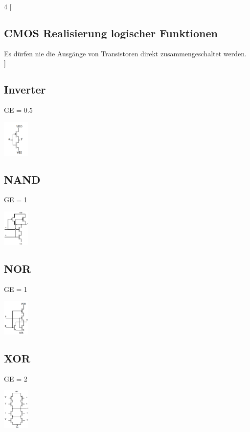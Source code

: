 \documentclass[10pt]{article}
\begin{document}
\begin{multicols}{4}
[\subsection{CMOS Realisierung logischer Funktionen}
Es dürfen nie die Ausgänge von Transistoren direkt zusammengeschaltet werden.
]
\subsection{Inverter}
GE = 0.5
\begin{center}
    \includegraphics[width=0.1\textwidth]{Inverter.PNG}
\end{center}
\columnbreak
\subsection{NAND}
GE = 1
\begin{center}
    \includegraphics[width=0.1\textwidth]{NAND.PNG}
\end{center}
\columnbreak
\subsection{NOR}
GE = 1
\begin{center}
    \includegraphics[width=0.1\textwidth]{NOR.PNG}
\end{center}
\columnbreak
\subsection{XOR}
GE = 2
\begin{center}
    \includegraphics[width=0.1\textwidth]{XOR_Trans.PNG}
\end{center}
\end{multicols}
\end{document}
